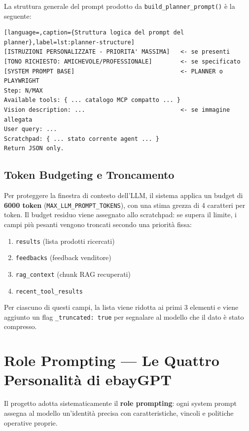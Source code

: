 La struttura generale del prompt prodotto da
\texttt{build\_planner\_prompt()} è la seguente:

\begin{lstlisting}[language=,caption={Struttura logica del prompt del planner},label=lst:planner-structure]
[ISTRUZIONI PERSONALIZZATE - PRIORITA' MASSIMA]   <- se presenti
[TONO RICHIESTO: AMICHEVOLE/PROFESSIONALE]        <- se specificato
[SYSTEM PROMPT BASE]                              <- PLANNER o PLAYWRIGHT
Step: N/MAX
Available tools: { ... catalogo MCP compatto ... }
Vision description: ...                           <- se immagine allegata
User query: ...
Scratchpad: { ... stato corrente agent ... }
Return JSON only.
\end{lstlisting}

\subsection{Token Budgeting e Troncamento}
\label{subsec:token-budget}

Per proteggere la finestra di contesto dell'LLM, il sistema applica un
budget di \textbf{6000 token} (\texttt{MAX\_LLM\_PROMPT\_TOKENS}),
con una stima grezza di 4 caratteri per token. Il budget residuo viene
assegnato allo scratchpad: se supera il limite, i campi più pesanti
vengono troncati secondo una priorità fissa:

\begin{enumerate}
    \item \texttt{results} (lista prodotti ricercati)
    \item \texttt{feedbacks} (feedback venditore)
    \item \texttt{rag\_context} (chunk RAG recuperati)
    \item \texttt{recent\_tool\_results}
\end{enumerate}

Per ciascuno di questi campi, la lista viene ridotta ai primi 3 elementi
e viene aggiunto un flag \texttt{\_truncated: true} per segnalare al
modello che il dato è stato compresso.


\section{Role Prompting — Le Quattro Personalità di ebayGPT}
\label{sec:role-prompting}

Il progetto adotta sistematicamente il \textbf{role prompting}: ogni
system prompt assegna al modello un'identità precisa con caratteristiche,
vincoli e politiche operative proprie.


